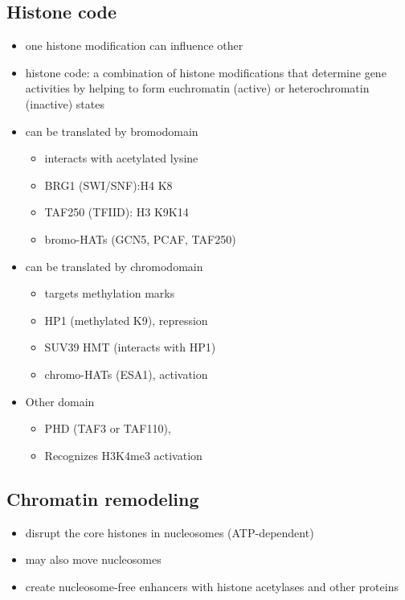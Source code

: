 \documentclass[10pt]{article}
\newenvironment{mitemize}
{
  \begin{itemize}
  \setlength{\itemsep}{1pt}
  \setlength{\parskip}{0pt}
  \setlength{\parsep}{0pt}}{\end{itemize}
}
\begin{document}
\subsection*{Histone code}
\begin{mitemize}
  \item one histone modification can influence other 
  \item histone code: a combination of histone modifications that determine gene activities by helping to form euchromatin (active) or heterochromatin (inactive) states
  \item can be translated by bromodomain 
  \begin{mitemize}
    \item interacts with acetylated lysine
    \item BRG1 (SWI/SNF):H4 K8 
    \item TAF250 (TFIID): H3 K9K14
    \item bromo-HATs (GCN5, PCAF, TAF250)
  \end{mitemize}
  \item can be translated by chromodomain
  \begin{mitemize}
    \item targets methylation marks
    \item HP1 (methylated K9), repression
    \item SUV39 HMT (interacts with HP1)
    \item chromo-HATs (ESA1), activation
  \end{mitemize}
  \item Other domain
  \begin{mitemize}
    \item PHD (TAF3 or TAF110), 
    \item Recognizes H3K4me3 activation
  \end{mitemize}
\end{mitemize}

\subsection*{Chromatin remodeling}
\begin{mitemize}
  \item disrupt the core histones in nucleosomes (ATP-dependent)
  \item may also move nucleosomes
  \item create nucleosome-free enhancers with histone acetylases and other proteins
\end{mitemize}
\end{document}
